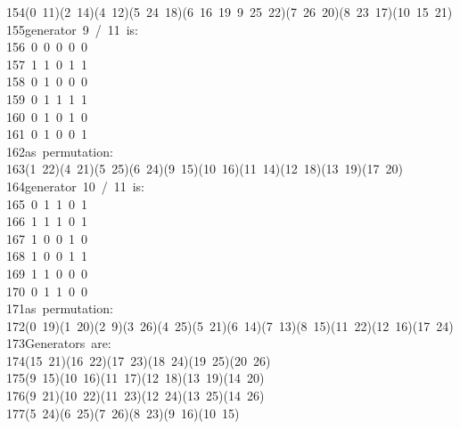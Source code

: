 \begin{tabbing}
154\>(0\ 11)(2\ 14)(4\ 12)(5\ 24\ 18)(6\ 16\ 19\ 9\ 25\ 22)(7\ 26\ 20)(8\ 23\ 17)(10\ 15\ 21)\\[0pt]
155\>generator\ 9\ /\ 11\ is:\ \\[0pt]
156\ 0\ 0\ 0\ 0\ 0\ \\[0pt]
157\ 1\ 1\ 0\ 1\ 1\ \\[0pt]
158\ 0\ 1\ 0\ 0\ 0\ \\[0pt]
159\ 0\ 1\ 1\ 1\ 1\ \\[0pt]
160\ 0\ 1\ 0\ 1\ 0\ \\[0pt]
161\ 0\ 1\ 0\ 0\ 1\ \\[0pt]
162\>as\ permutation:\ \\[0pt]
163\>(1\ 22)(4\ 21)(5\ 25)(6\ 24)(9\ 15)(10\ 16)(11\ 14)(12\ 18)(13\ 19)(17\ 20)\\[0pt]
164\>generator\ 10\ /\ 11\ is:\ \\[0pt]
165\ 0\ 1\ 1\ 0\ 1\ \\[0pt]
166\ 1\ 1\ 1\ 0\ 1\ \\[0pt]
167\ 1\ 0\ 0\ 1\ 0\ \\[0pt]
168\ 1\ 0\ 0\ 1\ 1\ \\[0pt]
169\ 1\ 1\ 0\ 0\ 0\ \\[0pt]
170\ 0\ 1\ 1\ 0\ 0\ \\[0pt]
171\>as\ permutation:\ \\[0pt]
172\>(0\ 19)(1\ 20)(2\ 9)(3\ 26)(4\ 25)(5\ 21)(6\ 14)(7\ 13)(8\ 15)(11\ 22)(12\ 16)(17\ 24)\\[0pt]
173\>Generators\ are:\\[0pt]
174\>(15\ 21)(16\ 22)(17\ 23)(18\ 24)(19\ 25)(20\ 26)\\[0pt]
175\>(9\ 15)(10\ 16)(11\ 17)(12\ 18)(13\ 19)(14\ 20)\\[0pt]
176\>(9\ 21)(10\ 22)(11\ 23)(12\ 24)(13\ 25)(14\ 26)\\[0pt]
177\>(5\ 24)(6\ 25)(7\ 26)(8\ 23)(9\ 16)(10\ 15)\\[0pt]

\end{tabbing}
